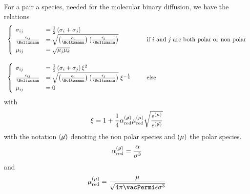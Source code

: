 For a pair a species, needed for the molecular binary diffusion, we have the relations
\begin{equation}
\begin{array}{l@{\qquad}l}
\renewcommand{\arraystretch}{1.2}
\left\{\begin{array}{l@{\quad}l}
  \LJdia_{ij}                      & = \frac{1}{2}\left(\LJdia_{i} + \LJdia_{j}\right) \\
  \frac{\LJdepth_{ij}}{\Boltzmann} & = \sqrt{\left(\frac{\LJdepth_{i}}{\Boltzmann}\right)\left(\frac{\LJdepth_{j}}{\Boltzmann}\right)} \\
  \dipole_{ij}                     & = \sqrt{\dipole_j\dipole_k}\\
\end{array}\right. & 
  \text{if $i$ and $j$ are both polar or non polar} \\\\
\left\{\begin{array}{l@{\quad}l}
  \LJdia_{ij}                      & = \frac{1}{2}\left(\LJdia_{i} + \LJdia_{j}\right) \xi^2 \\
  \frac{\LJdepth_{ij}}{\Boltzmann} & = \sqrt{\left(\frac{\LJdepth_{i}}{\Boltzmann}\right)\left(\frac{\LJdepth_{j}}{\Boltzmann}\right)}\; \xi^{-\frac{1}{6}} \\
  \dipole_{ij}                     & = 0\\
\end{array}\right. & 
  \text{else} \\
\end{array}
\label{LJ_reduced_parameters}
\end{equation}
with
\begin{equation}
\xi = 1 + \frac{1}{4}\polarizability^{(\not{\dipole})}_\text{red}\dipole^{(\dipole)}_\text{red}\sqrt{\frac{\LJdepth^{(\dipole)}}{\LJdepth^{(\not{\dipole})}}}
\label{reduced_parameter:xi}
\end{equation}
with the notation $(\not\!\!\dipole)$ denoting the non polar
species and $(\dipole)$ the polar species.
\begin{equation}
\polarizability_\text{red}^{(\not{\dipole})} = \frac{\polarizability}{\LJdia^3}
\label{reduced_parameter:pol_non_pol:polarizability}
\end{equation}
and
\begin{equation}
\dipole_\text{red}^{(\dipole)} = \frac{\dipole}{\sqrt{4\pi\vacPermi\LJdepth\LJdia^3}}
\label{reduced_parameter:pol_non_pol:dipole}
\end{equation}
